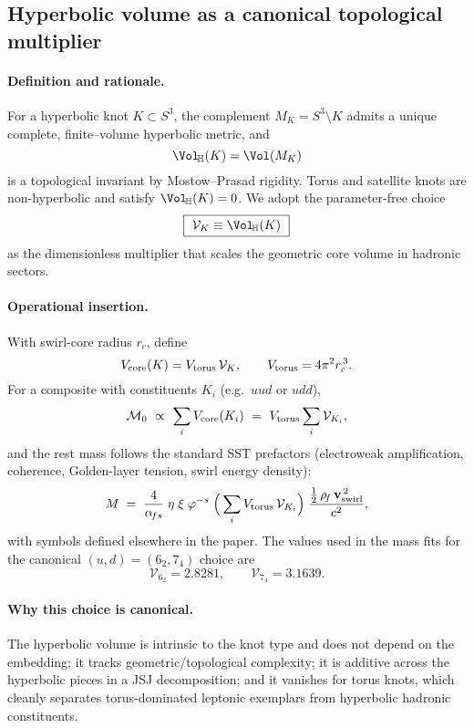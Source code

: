 \subsection*{Hyperbolic volume as a canonical topological multiplier}
\label{sec:hyp-volume}

\paragraph{Definition and rationale.}
For a hyperbolic knot \(K\subset S^3\), the complement \(M_K=S^3\!\setminus\!K\) admits a unique complete, finite–volume hyperbolic metric, and
\[
	\Vol_{\!\mathbb{H}}(K)=\Vol(M_K)
\]
is a topological invariant by Mostow–Prasad rigidity. Torus and satellite knots are non-hyperbolic and satisfy \(\Vol_{\!\mathbb{H}}(K)=0\). We adopt the parameter-free choice
\[
	\boxed{\ \mathcal V_K \equiv \Vol_{\!\mathbb{H}}(K)\ }
\]
as the dimensionless multiplier that scales the geometric core volume in hadronic sectors.

\paragraph{Operational insertion.}
With swirl-core radius \(r_c\), define
\[
	V_{\rm core}(K)=V_{\rm torus}\,\mathcal V_K,\qquad
	V_{\rm torus}=4\pi^2 r_c^{\,3}.
\]
For a composite with constituents \(K_i\) (e.g.\ \(uud\) or \(udd\)),
\[
	\mathcal M_0\ \propto\ \sum_i V_{\rm core}(K_i)
	\ =\ V_{\rm torus}\sum_i \mathcal V_{K_i},
\]
and the rest mass follows the standard SST prefactors (electroweak amplification, coherence, Golden-layer tension, swirl energy density):
\[
	M \;=\; \frac{4}{\alpha_{\!fs}}\;\eta\;\xi\;\varphi^{-s}\;
	\Big(\sum_i V_{\rm torus}\,\mathcal{V}_{K_i}\Big)\;
	\frac{\tfrac12\,\rho_{\!f}\,\mathbf{v}_{\mathrm{swirl}}^{\,2}}{c^2},
\]
with symbols defined elsewhere in the paper. The values used in the mass fits for the canonical \((u,d)=(6_2,7_4)\) choice are
\[
	\mathcal{V}_{6_2}=2.8281,\qquad
	\mathcal{V}_{7_4}=3.1639.
\]

\paragraph{Why this choice is canonical.}
The hyperbolic volume is intrinsic to the knot type and does not depend on the embedding; it tracks geometric/topological complexity; it is additive across the hyperbolic pieces in a JSJ decomposition; and it vanishes for torus knots, which cleanly separates torus-dominated leptonic exemplars from hyperbolic hadronic constituents.

